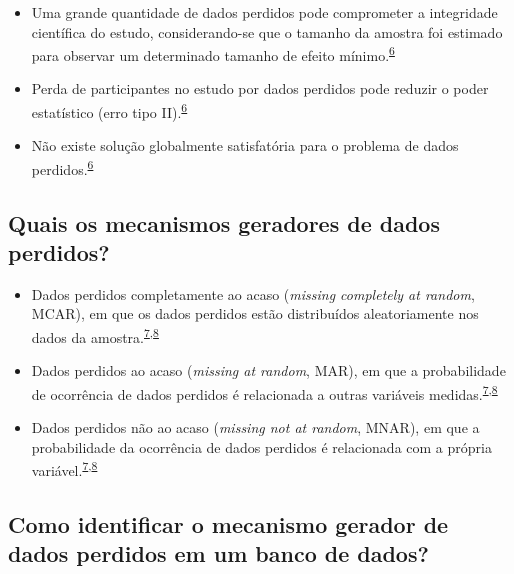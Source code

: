 \documentclass[
]{book}
\begin{document}
\begin{itemize}
\item
  Uma grande quantidade de dados perdidos pode comprometer a integridade científica do estudo, considerando-se que o tamanho da amostra foi estimado para observar um determinado tamanho de efeito mínimo.\textsuperscript{\protect\hyperlink{ref-Altman2007}{6}}
\item
  Perda de participantes no estudo por dados perdidos pode reduzir o poder estatístico (erro tipo II).\textsuperscript{\protect\hyperlink{ref-Altman2007}{6}}
\item
  Não existe solução globalmente satisfatória para o problema de dados perdidos.\textsuperscript{\protect\hyperlink{ref-Altman2007}{6}}
\end{itemize}

\hypertarget{quais-os-mecanismos-geradores-de-dados-perdidos}{%
\subsection{Quais os mecanismos geradores de dados perdidos?}\label{quais-os-mecanismos-geradores-de-dados-perdidos}}

\begin{itemize}
\item
  Dados perdidos completamente ao acaso (\emph{missing completely at random}, MCAR), em que os dados perdidos estão distribuídos aleatoriamente nos dados da amostra.\textsuperscript{\protect\hyperlink{ref-Heymans2022}{7},\protect\hyperlink{ref-carpenter2021}{8}}
\item
  Dados perdidos ao acaso (\emph{missing at random}, MAR), em que a probabilidade de ocorrência de dados perdidos é relacionada a outras variáveis medidas.\textsuperscript{\protect\hyperlink{ref-Heymans2022}{7},\protect\hyperlink{ref-carpenter2021}{8}}
\item
  Dados perdidos não ao acaso (\emph{missing not at random}, MNAR), em que a probabilidade da ocorrência de dados perdidos é relacionada com a própria variável.\textsuperscript{\protect\hyperlink{ref-Heymans2022}{7},\protect\hyperlink{ref-carpenter2021}{8}}
\end{itemize}

\hypertarget{como-identificar-o-mecanismo-gerador-de-dados-perdidos-em-um-banco-de-dados}{%
\subsection{Como identificar o mecanismo gerador de dados perdidos em um banco de dados?}\label{como-identificar-o-mecanismo-gerador-de-dados-perdidos-em-um-banco-de-dados}}
\end{document}
